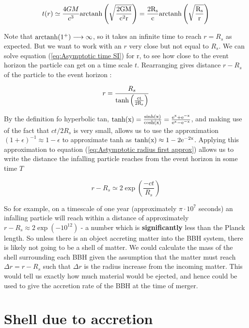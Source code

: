 \documentclass{article}
\begin{document}
\begin{equation}\label{eq:Asymptotic time SI}
    t(r) \simeq \frac{4 G M}{c^3} \rm{arctanh\left(  \sqrt{\frac{2 G M}{c^2 r}}   \right)}
    = \frac{2 R_s}{c} \rm{arctanh \left(  \sqrt{\frac{R_s}{r}}  \right)}
\end{equation}

Note that $\rm{arctanh}(1^+) \longrightarrow \infty$, so it takes an infinite time to reach $r = R_s$ as expected. But we want to work with an $r$ very close but not equal to $R_s$. We can solve equation (\ref{eq:Asymptotic time SI}) for r, to see how close to the event horizon the particle can get on a time scale $t$. Rearranging gives distance $r-R_s$ of the particle to the event horizon :

\begin{equation}\label{eq:Astymptotic radius first approx}
    r = \frac{R_s}{\rm{tanh\left(  \frac{c t}{2 R_s} \right)}}
\end{equation}

By the definition fo hyperbolic tan, $\rm{tanh(x)} = \frac{\rm{sinh(x)}}{cosh(x)}=\frac{e^x+e^{-x}}{e^{x}-e^{-x}}$, and making use of the fact that $c t / 2 R_s$ is very small, allows us to use the approximation $(1+\epsilon)^{-1} \approx 1 - \epsilon$ to approximate tanh as $\rm{tanh(x)} \approx 1 - 2 e^{-2 x}$. Applying this approximation to equation (\ref{eq:Astymptotic radius first approx}) allows us to write the distance the infalling particle reaches from the event horizon in some time $T$

\begin{equation}
    r - R_s \simeq 2  \exp{\left(   \frac{-c t}{R_s}   \right)}
\end{equation}

So for example, on a timescale of one year (approximately $\pi \cdot 10^7$ seconds) an infalling particle will reach within a distance  of approximately $r-R_s \approx 2 \exp{\left( - 10^{12}   \right)}$ -  a number which is \textbf{significantly} less than the Planck length. So unless there is an object accreting matter into the BBH system, there is likely not going to be a shell of matter. We could calculate the mass of the shell surrounding each BBH given the assumption that the matter must reach $\Delta r = r-R_s$ such that $\Delta r$ is the radius increase from the incoming matter. This would tell us exactly how much material would be ejected, and hence could be used to give the accretion rate of the BBH at the time of merger. 

\section{Shell due to accretion}
\end{document}
